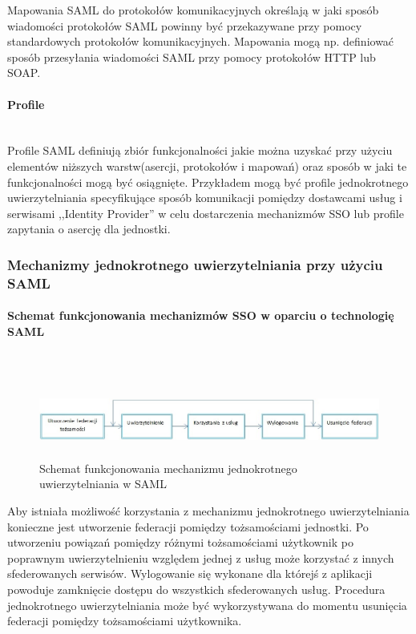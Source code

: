 			Mapowania SAML do protokołów komunikacyjnych określają w jaki sposób wiadomości protokołów SAML powinny być przekazywane przy pomocy standardowych protokołów komunikacyjnych.  Mapowania mogą np. definiować sposób przesyłania wiadomości SAML przy pomocy protokołów HTTP lub SOAP.

		\paragraph{Profile}\mbox{}\\

			Profile SAML definiują zbiór funkcjonalności jakie można uzyskać przy użyciu elementów niższych warstw(asercji, protokołów i mapowań) oraz sposób w jaki te funkcjonalności mogą być osiągnięte. Przykładem mogą być profile jednokrotnego uwierzytelniania specyfikujące sposób komunikacji pomiędzy dostawcami usług i serwisami ,,Identity Provider'' w celu dostarczenia mechanizmów SSO lub profile zapytania o asercję dla jednostki.

	\subsubsection{Mechanizmy jednokrotnego uwierzytelniania przy użyciu SAML}

		\paragraph{Schemat funkcjonowania mechanizmów SSO w oparciu o technologię SAML}\mbox{}\\

			\begin{figure}[h]
				\centering
					\includegraphics[width=15cm,height=2.5cm]{img/samlSSO.jpg}
				\caption{Schemat funkcjonowania mechanizmu jednokrotnego uwierzytelniania w SAML}
				\label{Schemat funkcjonowania mechanizmu jednokrotnego uwierzytelniania w SAML}
			\end{figure}

			Aby istniała możliwość korzystania z mechanizmu jednokrotnego uwierzytelniania konieczne jest utworzenie federacji pomiędzy tożsamościami jednostki. Po utworzeniu powiązań pomiędzy różnymi tożsamościami użytkownik po poprawnym uwierzytelnieniu względem jednej z usług może korzystać z innych sfederowanych serwisów. Wylogowanie się wykonane dla którejś z aplikacji powoduje zamknięcie dostępu do wszystkich sfederowanych usług. Procedura jednokrotnego uwierzytelniania może być wykorzystywana do momentu usunięcia federacji pomiędzy tożsamościami użytkownika.

